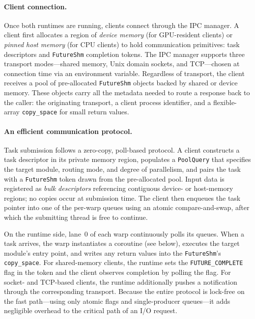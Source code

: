 \paragraph{Client connection.}
Once both runtimes are running, clients connect through the IPC
manager.  A client first allocates a region of \emph{device memory}
(for GPU-resident clients) or \emph{pinned host memory} (for CPU
clients) to hold communication primitives: task descriptors and
\texttt{FutureShm} completion tokens.
The IPC manager supports three transport modes---shared memory, Unix
domain sockets, and TCP---chosen at connection time via an environment
variable.  Regardless of transport, the client receives a pool of
pre-allocated \texttt{FutureShm} objects backed by shared or device
memory.  These objects carry all the metadata needed to route a
response back to the caller: the originating transport, a client
process identifier, and a flexible-array \texttt{copy\_space} for
small return values.

\paragraph{An efficient communication protocol.}
Task submission follows a zero-copy, poll-based protocol.
A client constructs a task descriptor in its private memory region,
populates a \texttt{PoolQuery} that specifies the target module,
routing mode, and degree of parallelism, and pairs the task with a
\texttt{FutureShm} token drawn from the pre-allocated pool.
Input data is registered as \emph{bulk descriptors} referencing
contiguous device- or host-memory regions; no copies occur at
submission time.  The client then enqueues the task pointer into one
of the per-warp queues using an atomic compare-and-swap, after which
the submitting thread is free to continue.

On the runtime side, lane~0 of each warp continuously polls its
queues.  When a task arrives, the warp instantiates a coroutine (see
below), executes the target module's entry point, and writes any
return values into the \texttt{FutureShm}'s \texttt{copy\_space}.
For shared-memory clients, the runtime sets the
\texttt{FUTURE\_COMPLETE} flag in the token and the client observes
completion by polling the flag.  For socket- and TCP-based clients,
the runtime additionally pushes a notification through the
corresponding transport.  Because the entire protocol is lock-free on
the fast path---using only atomic flags and single-producer
queues---it adds negligible overhead to the critical path of an I/O
request.

